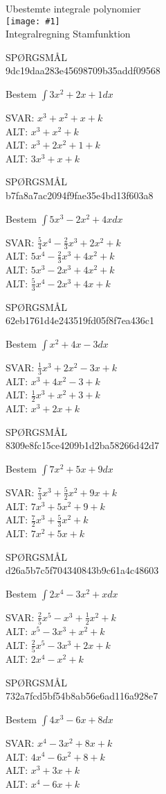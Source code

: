 \documentclass[]{article}
\newcounter{spgcounter}
\newenvironment{question}[2]{\addtocounter{spgcounter}{1} SPØRGSMÅL \thespgcounter\\}{\hspace{50px}}
\newcommand{\name}[1]{{\huge #1}\\}
\newcommand{\tag}[1]{#1}
\newcommand{\cover}[1]{\texttt{[image: \#1]}\\}
\newcommand{\answer}[1]{{\color{green} SVAR: #1}\\}
\newcommand{\alt}[1]{{\color{red} ALT: #1}\\}
\begin{document}
\name{Ubestemte integrale polynomier}
\cover{integralepolynomier.png}
\tag{Integralregning}
\tag{Stamfunktion}

\begin{question}{multi}\id{9dc19daa283e45698709b35addf09568}

Bestem $\int{3x^2+2x+1} dx$

\answer{$x^3 + x^2 + x + k$}
\alt{$x^3 + x^2 + k$}
\alt{$x^3 + 2x^2 + 1 + k$}
\alt{$3x^3 + x + k$}

\end{question}

\begin{question}{multi}\id{b7fa8a7ac2094f9fae35e4bd13f603a8}

Bestem $\int{5x^3 - 2x^2 + 4x} dx$

\answer{$\frac{5}{4}x^4 - \frac{2}{3}x^3 + 2x^2 + k$}
\alt{$5x^4 - \frac{2}{3}x^3 + 4x^2 + k$}
\alt{$5x^3 - 2x^3 + 4x^2 + k$}
\alt{$\frac{5}{3}x^4 - 2x^3 + 4x + k$}

\end{question}

\begin{question}{multi}\id{62eb1761d4e243519fd05f8f7ea436c1}

Bestem $\int{x^2 + 4x - 3} dx$

\answer{$\frac{1}{3}x^3 + 2x^2 - 3x + k$}
\alt{$x^3 + 4x^2 - 3 + k$}
\alt{$\frac{1}{2}x^3 + x^2 + 3 + k$}
\alt{$x^3 + 2x + k$}

\end{question}

\begin{question}{multi}\id{8309e8fc15ce4209b1d2ba58266d42d7}

Bestem $\int{7x^2 + 5x + 9} dx$

\answer{$\frac{7}{3}x^3 + \frac{5}{2}x^2 + 9x + k$}
\alt{$7x^3 + 5x^2 + 9 + k$}
\alt{$\frac{7}{2}x^3 + \frac{5}{3}x^2 + k$}
\alt{$7x^2 + 5x + k$}

\end{question}

\begin{question}{multi}\id{d26a5b7c5f704340843b9c61a4c48603}

Bestem $\int{2x^4 - 3x^2 + x} dx$

\answer{$\frac{2}{5}x^5 - x^3 + \frac{1}{2}x^2 + k$}
\alt{$x^5 - 3x^3 + x^2 + k$}
\alt{$\frac{2}{5}x^5 - 3x^3 + 2x + k$}
\alt{$2x^4 - x^2 + k$}

\end{question}

\begin{question}{multi}\id{732a7fcd5bf54b8ab56e6ad116a928e7}

Bestem $\int{4x^3 - 6x + 8} dx$

\answer{$x^4 - 3x^2 + 8x + k$}
\alt{$4x^4 - 6x^2 + 8 + k$}
\alt{$x^3 + 3x + k$}
\alt{$x^4 - 6x + k$}

\end{question}
\end{document}

